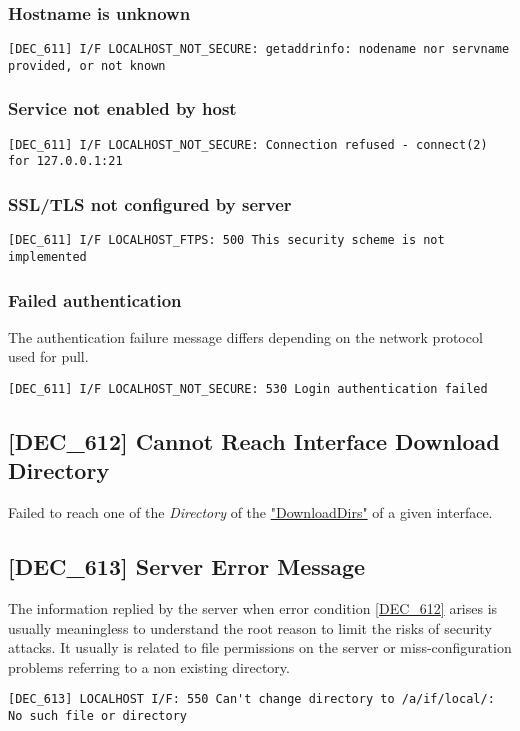 \documentclass[dec_sum_main.tex]{subfiles}
\begin{document}
\subsubsection{Hostname is unknown}
\begin{verbatim}
[DEC_611] I/F LOCALHOST_NOT_SECURE: getaddrinfo: nodename nor servname provided, or not known
\end{verbatim}

\subsubsection{Service not enabled by host}
\begin{verbatim}
[DEC_611] I/F LOCALHOST_NOT_SECURE: Connection refused - connect(2) for 127.0.0.1:21
\end{verbatim}

\subsubsection{SSL/TLS not configured by server}
\begin{verbatim}
[DEC_611] I/F LOCALHOST_FTPS: 500 This security scheme is not implemented
\end{verbatim}

\subsubsection{Failed authentication}
The authentication failure message differs depending on the network protocol used for pull.
\begin{verbatim}
[DEC_611] I/F LOCALHOST_NOT_SECURE: 530 Login authentication failed
\end{verbatim}

\subsection{[DEC\_612] Cannot Reach Interface Download Directory}
\label{DEC612}
Failed to reach one of the \textit{Directory} of the \hyperref[DownloadDirs]{"DownloadDirs"} of a given interface.

\subsection{[DEC\_613] Server Error Message }
The information replied by the server when error condition \hyperref[DEC612]{[DEC\_612]} arises is usually meaningless to understand the root reason to limit the risks of security attacks. It usually is related to file permissions on the server or miss-configuration problems referring to a non existing directory.
\begin{verbatim}
[DEC_613] LOCALHOST I/F: 550 Can't change directory to /a/if/local/: No such file or directory
\end{verbatim}
\end{document}
